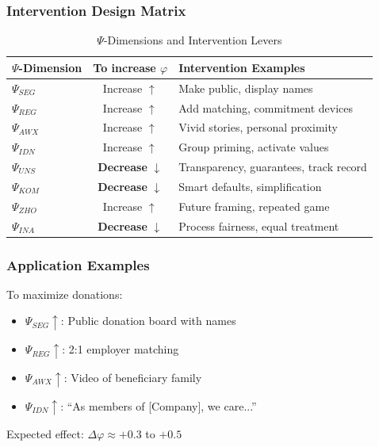 \subsubsection{Intervention Design Matrix}

\begin{table}[htbp]
\centering
\caption{$\Psi$-Dimensions and Intervention Levers}
\label{tab:intervention-matrix}
\renewcommand{\arraystretch}{1.2}
\begin{tabular}{@{}lcl@{}}
\toprule
\textbf{$\Psi$-Dimension} & \textbf{To increase $\varphi$} & \textbf{Intervention Examples} \\
\midrule
$\Psi_{SEG}$ & Increase $\uparrow$ & Make public, display names \\
$\Psi_{REG}$ & Increase $\uparrow$ & Add matching, commitment devices \\
$\Psi_{AWX}$ & Increase $\uparrow$ & Vivid stories, personal proximity \\
$\Psi_{IDN}$ & Increase $\uparrow$ & Group priming, activate values \\
$\Psi_{UNS}$ & \textbf{Decrease} $\downarrow$ & Transparency, guarantees, track record \\
$\Psi_{KOM}$ & \textbf{Decrease} $\downarrow$ & Smart defaults, simplification \\
$\Psi_{ZHO}$ & Increase $\uparrow$ & Future framing, repeated game \\
$\Psi_{INA}$ & \textbf{Decrease} $\downarrow$ & Process fairness, equal treatment \\
\bottomrule
\end{tabular}
\end{table}

\subsubsection{Application Examples}

\begin{example}
To maximize donations:
\begin{itemize}
\item $\Psi_{SEG} \uparrow$: Public donation board with names
\item $\Psi_{REG} \uparrow$: 2:1 employer matching
\item $\Psi_{AWX} \uparrow$: Video of beneficiary family
\item $\Psi_{IDN} \uparrow$: ``As members of [Company], we care...''
\end{itemize}
Expected effect: $\Delta\varphi \approx +0.3$ to $+0.5$
\end{example}

